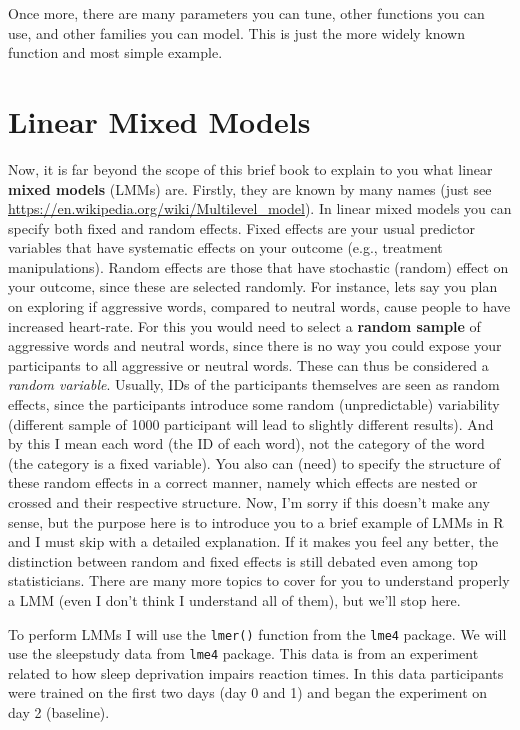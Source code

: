 \documentclass[
]{book}
\begin{document}
Once more, there are many parameters you can tune, other functions you can use, and other families you can model. This is just the more widely known function and most simple example.

\hypertarget{linear-mixed-models}{%
\section{Linear Mixed Models}\label{linear-mixed-models}}

Now, it is far beyond the scope of this brief book to explain to you what linear \textbf{mixed models} (LMMs) are. Firstly, they are known by many names (just see \url{https://en.wikipedia.org/wiki/Multilevel_model}). In linear mixed models you can specify both fixed and random effects. Fixed effects are your usual predictor variables that have systematic effects on your outcome (e.g., treatment manipulations). Random effects are those that have stochastic (random) effect on your outcome, since these are selected randomly. For instance, lets say you plan on exploring if aggressive words, compared to neutral words, cause people to have increased heart-rate. For this you would need to select a \textbf{random sample} of aggressive words and neutral words, since there is no way you could expose your participants to all aggressive or neutral words. These can thus be considered a \emph{random variable}. Usually, IDs of the participants themselves are seen as random effects, since the participants introduce some random (unpredictable) variability (different sample of 1000 participant will lead to slightly different results). And by this I mean each word (the ID of each word), not the category of the word (the category is a fixed variable). You also can (need) to specify the structure of these random effects in a correct manner, namely which effects are nested or crossed and their respective structure. Now, I'm sorry if this doesn't make any sense, but the purpose here is to introduce you to a brief example of LMMs in R and I must skip with a detailed explanation. If it makes you feel any better, the distinction between random and fixed effects is still debated even among top statisticians. There are many more topics to cover for you to understand properly a LMM (even I don't think I understand all of them), but we'll stop here.

To perform LMMs I will use the \texttt{lmer()} function from the \texttt{lme4} package. We will use the sleepstudy data from \texttt{lme4} package. This data is from an experiment related to how sleep deprivation impairs reaction times. In this data participants were trained on the first two days (day 0 and 1) and began the experiment on day 2 (baseline).
\end{document}

